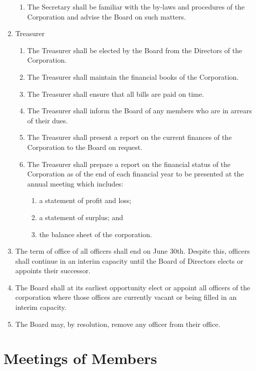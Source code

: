 \documentclass{article}
\begin{document}
\begin{enumerate}
\begin{enumerate}
	\item The Secretary shall be familiar with the by-laws and procedures of the Corporation and advise the Board on such matters.
	\end{enumerate}
\item Treasurer
	\begin{enumerate}
	\item The Treasurer shall be elected by the Board from the Directors of the Corporation.
	\item The Treasurer shall maintain the financial books of the Corporation.
	\item The Treasurer shall ensure that all bills are paid on time.
	\item The Treasurer shall inform the Board of any members who are in arrears of their dues.
	\item The Treasurer shall present a report on the current finances of the Corporation to the Board on request.
	\item The Treasurer shall prepare a report on the financial status of the Corporation as of the end of each financial year to be presented at the annual meeting which includes:
		\begin{enumerate}
		\item a statement of profit and loss;
		\item a statement of surplus; and
		\item the balance sheet of the corporation.
		\end{enumerate}
	\end{enumerate}
\item The term of office of all officers shall end on June 30th. Despite this, officers shall continue in an interim capacity until the Board of Directors elects or appoints their successor.
\item The Board shall at its earliest opportunity elect or appoint all officers of the corporation where those offices are currently vacant or being filled in an interim capacity.
\item The Board may, by resolution, remove any officer from their office.
\end{enumerate}

\section{Meetings of Members}
\end{document}
